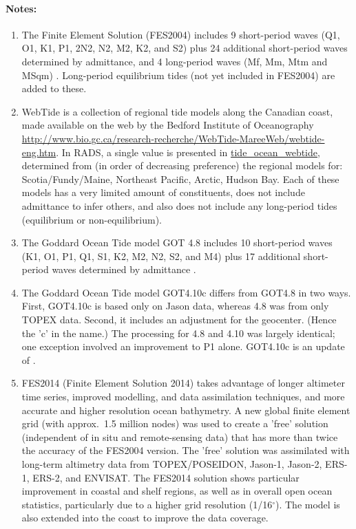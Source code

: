 \documentclass[a4paper,11pt,openany,natbib,nomargin]{thesis}
\makeatletter
\renewcommand\deg{\ensuremath{^\circ}}
\newcommand\var[1]{\url{#1}\index{variables!#1@\protect\url{#1}}}
\newenvironment{notes}[1][Notes:]{\FloatBarrier\paragraph{#1}\begin{enumerate}}{\end{enumerate}}
\makeatother
\begin{document}
\begin{notes}
\item The Finite Element Solution (FES2004) includes 9 short-period waves (Q1, O1, K1, P1, 2N2, N2, M2, K2, and S2) plus 24 additional short-period waves determined by admittance, and 4 long-period waves (Mf, Mm, Mtm and MSqm) \citep{lyard2006}. Long-period equilibrium tides (not yet included in FES2004) are added to these.\label{item:tide_ocean_fes04}\label{item:tide_load_fes04}
\item WebTide is a collection of regional tide models along the Canadian coast, made available on the web by the Bedford Institute of Oceanography \url{http://www.bio.gc.ca/research-recherche/WebTide-MareeWeb/webtide-eng.htm}. In RADS, a single value is presented in \var{tide_ocean_webtide}, determined from (in order of decreasing preference) the regional models for: Scotia/Fundy/Maine, Northeast Pacific, Arctic, Hudson Bay. Each of these models has a very limited amount of constituents, does not include admittance to infer others, and also does not include any long-period tides (equilibrium or non-equilibrium).\label{item:tide_ocean_webtide}
\item The Goddard Ocean Tide model GOT 4.8 includes 10 short-period waves (K1, O1, P1, Q1, S1, K2, M2, N2, S2, and M4) plus 17 additional short-period waves determined by admittance \citep{ray2011}.\label{item:tide_ocean_got48}\label{item:tide_load_got48}
\item The Goddard Ocean Tide model GOT4.10c differs from GOT4.8 in two ways. First, GOT4.10c is based only on Jason data, whereas 4.8 was from only TOPEX data. Second, it includes an adjustment for the geocenter. (Hence the 'c' in the name.) The processing for 4.8 and 4.10 was largely identical; one exception involved an improvement to P1 alone. GOT4.10c is an update of \citet{ray2013}.\label{item:tide_ocean_got410}\label{item:tide_load_got410}
\item FES2014 (Finite Element Solution 2014) takes advantage of longer altimeter time series, improved modelling, and data assimilation techniques, and more accurate and higher resolution ocean bathymetry. A new global finite element grid (with approx.\ 1.5 million nodes) was used to create a 'free' solution (independent of in situ and remote-sensing data) that has more than twice the accuracy of the FES2004 version. The 'free' solution was assimilated with long-term altimetry data from TOPEX/POSEIDON, Jason-1, Jason-2, ERS-1, ERS-2, and ENVISAT. The FES2014 solution shows particular improvement in coastal and shelf regions, as well as in overall open ocean statistics, particularly due to a higher grid resolution (1/16\deg{}). The model is also extended into the coast to improve the data coverage.

\end{notes}
\end{document}
